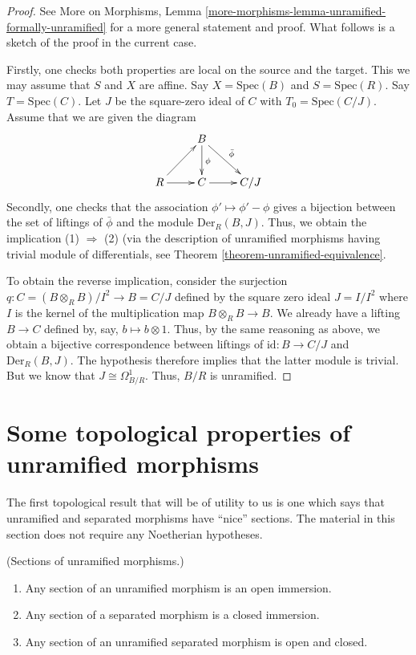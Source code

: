 \begin{proof}
See More on Morphisms,
Lemma \ref{more-morphisms-lemma-unramified-formally-unramified}
for a more general statement and proof.
What follows is a sketch of the proof in the current case.

\medskip\noindent
Firstly, one checks both properties are local on the source and the target.
This we may assume that $S$ and $X$ are affine.
Say $X = \text{Spec}(B)$ and $S = \text{Spec}(R)$.
Say $T = \text{Spec}(C)$. Let $J$ be the square-zero ideal of $C$
with $T_0 = \text{Spec}(C/J)$. Assume that we are given the diagram
$$
\xymatrix{
& B \ar[d]^\phi \ar[rd]^{\bar{\phi}}	
& \\
R \ar[r] \ar[ur] & C \ar[r]						
& C/J
}
$$
Secondly, one checks that the association $\phi' \mapsto \phi' - \phi$
gives a bijection between the set of liftings of $\bar{\phi}$ and the module
$\text{Der}_R(B, J)$. Thus, we obtain the implication (1) $\Rightarrow$ (2)
(via the description of unramified morphisms having trivial module
of differentials, see Theorem \ref{theorem-unramified-equivalence}.

\medskip\noindent
To obtain the reverse implication, consider the surjection
$q : C = (B \otimes_R B)/I^2 \to B = C/J$ defined by the square zero ideal
$J = I/I^2$ where $I$ is the kernel of the multiplication map
$B \otimes_R B \to B$. We already have a lifting $B \to C$ defined by, say,
$b \mapsto b \otimes 1$. Thus, by the same reasoning as above, we obtain a
bijective correspondence between liftings of $\mathrm{id} : B \to C/J$ and
$\text{Der}_R(B, J)$. The hypothesis therefore implies that the latter module is
trivial. But we know that $J \cong \Omega^1_{B/R}$. Thus, $B/R$ is unramified.
\end{proof}

\section{Some topological properties of unramified morphisms}
\label{section-topological-unramified}

\noindent
The first topological result that will be of utility to us is one which says
that unramified and separated morphisms have ``nice'' sections.
The material in this section does not require any Noetherian hypotheses.

\begin{proposition}
\label{proposition-properties-sections}
(Sections of unramified morphisms.)
\begin{enumerate}
\item Any section of an unramified morphism is an open immersion.
\item Any section of a separated morphism is a closed immersion.
\item Any section of an unramified separated morphism is open and closed.
\end{enumerate}
\end{proposition}

